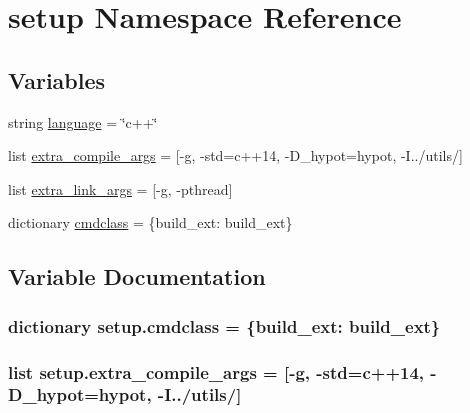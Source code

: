 \hypertarget{namespacesetup}{}\section{setup Namespace Reference}
\label{namespacesetup}
\subsection*{Variables}
\begin{DoxyCompactItemize}
\item 
string \hyperlink{namespacesetup_a7c551b774528bc8ca826e41c09a9c266}{language} = \char`\"{}c++\char`\"{}
\item 
list \hyperlink{namespacesetup_ae06ccc95fcdc051223af0cefa0f492d5}{extra\+\_\+compile\+\_\+args} = \mbox{[}\textquotesingle{}-\/g\textquotesingle{}, \textquotesingle{}-\/std=c++14\textquotesingle{}, \textquotesingle{}-\/D\+\_\+hypot=hypot\textquotesingle{}, \textquotesingle{}-\/I../utils/\textquotesingle{}\mbox{]}
\item 
list \hyperlink{namespacesetup_a3ecdc68a8b675e6105cdb4896e3a3f13}{extra\+\_\+link\+\_\+args} = \mbox{[}\textquotesingle{}-\/g\textquotesingle{}, \textquotesingle{}-\/pthread\textquotesingle{}\mbox{]}
\item 
dictionary \hyperlink{namespacesetup_ad23e0b4fd9e5e6f20f8313d75832d1e2}{cmdclass} = \{\textquotesingle{}build\+\_\+ext\textquotesingle{}\+: build\+\_\+ext\}
\end{DoxyCompactItemize}


\subsection{Variable Documentation}
\hypertarget{namespacesetup_ad23e0b4fd9e5e6f20f8313d75832d1e2}{}
\subsubsection[{cmdclass}]{\setlength{\rightskip}{0pt plus 5cm}dictionary setup.\+cmdclass = \{\textquotesingle{}build\+\_\+ext\textquotesingle{}\+: build\+\_\+ext\}}\label{namespacesetup_ad23e0b4fd9e5e6f20f8313d75832d1e2}
\hypertarget{namespacesetup_ae06ccc95fcdc051223af0cefa0f492d5}{}
\subsubsection[{extra\+\_\+compile\+\_\+args}]{\setlength{\rightskip}{0pt plus 5cm}list setup.\+extra\+\_\+compile\+\_\+args = \mbox{[}\textquotesingle{}-\/g\textquotesingle{}, \textquotesingle{}-\/std=c++14\textquotesingle{}, \textquotesingle{}-\/D\+\_\+hypot=hypot\textquotesingle{}, \textquotesingle{}-\/I../utils/\textquotesingle{}\mbox{]}}\label{namespacesetup_ae06ccc95fcdc051223af0cefa0f492d5}
\hypertarget{namespacesetup_a3ecdc68a8b675e6105cdb4896e3a3f13}{}
